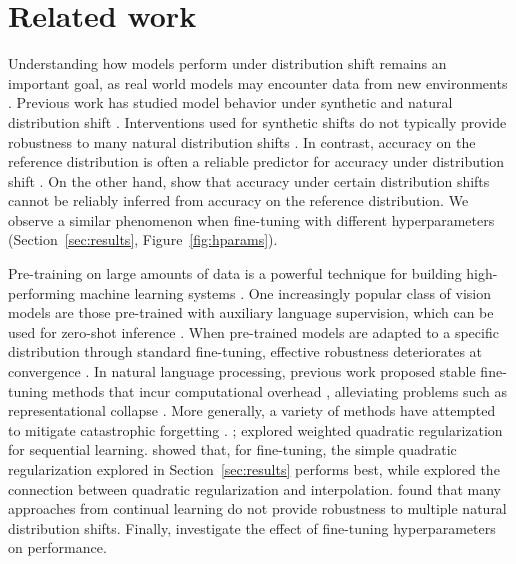 \beforesec
\section{Related work}\label{sec:related}
\postsec
{}
Understanding how models perform under distribution shift remains an important goal, as real world models may encounter data from new environments \cite{quinonero2009dataset, torralba2011unbiased}. 
Previous work has studied model behavior under synthetic \cite{imagenetc,tramer2017ensemble,madry2017towards,geirhos2018generalisation,eykholt2018robust,alcorn2019strike} and natural distribution shift \cite{imagenetr, wilds2021, imagenetsketch, objectnet, imageneta}.
Interventions used for synthetic shifts do not typically provide robustness to many natural distribution shifts \cite{taori2020measuring}. 
In contrast, accuracy on the reference distribution is often a reliable predictor for accuracy under distribution shift \cite{yadav2019cold, miller2020effect, taori2020measuring, sun2020scalability, miller21b}. On the other hand, \citet{d2020underspecification} show that accuracy under certain distribution shifts cannot be reliably inferred from accuracy on the reference distribution.
We observe a similar phenomenon when fine-tuning with different hyperparameters (Section~\ref{sec:results}, Figure~\ref{fig:hparams}).

Pre-training on large amounts of data is a powerful technique for building high-performing machine learning systems %
\cite{sharif2014cnn, dosovitskiy2021an,kolesnikov2020big,yalniz2019billion,radford2019language,brown2020language}.
One increasingly popular class of vision models are those pre-trained with auxiliary language supervision, which can be used for zero-shot inference \cite{desai2021virtex,sariyildiz2020learning,zhang2020contrastive,radford2021learning,jia2021scaling,pham2021scaling,zhai21lit}.
When pre-trained models are adapted to a specific distribution through standard fine-tuning, effective robustness deteriorates at convergence \cite{andreassen2021evolution}.
In natural language processing, previous work proposed stable fine-tuning methods that incur computational overhead \cite{jiang2019smart,zhu2019freelb}, alleviating problems such as representational collapse \cite{aghajanyan2021better}.
More generally, a variety of methods have attempted to mitigate catastrophic forgetting \cite{MCCLOSKEY1989109}. \citet{kirkpatrick2017overcoming}; \citet{zenke2017continual} explored weighted quadratic regularization for sequential learning. \citet{xuhong2018explicit} showed that, for fine-tuning, the simple quadratic regularization explored in Section~\ref{sec:results} performs best, while \citet{lubana2021quadratic} explored the connection between quadratic regularization and interpolation.
\citet{andreassen2021evolution} found that many approaches from continual learning do not provide robustness to multiple natural distribution shifts. Finally, \citet{li2020rethinking} investigate the effect of fine-tuning hyperparameters on performance.


